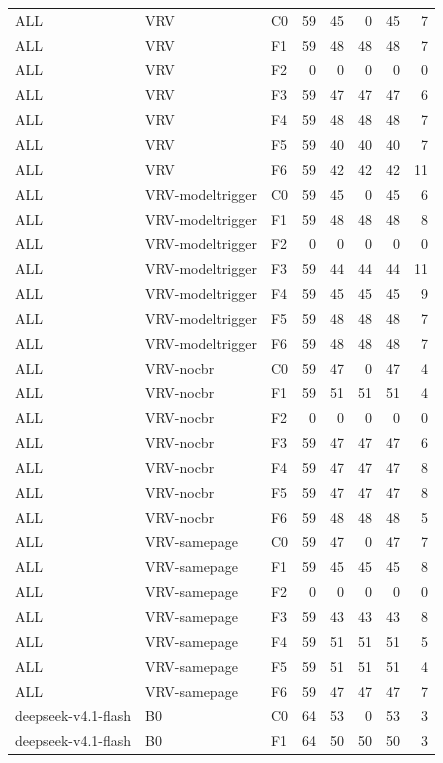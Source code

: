 \begin{tabular}{lllrrrrr}
ALL & VRV & C0 & 59 & 45 & 0 & 45 & 7 \\
ALL & VRV & F1 & 59 & 48 & 48 & 48 & 7 \\
ALL & VRV & F2 & 0 & 0 & 0 & 0 & 0 \\
ALL & VRV & F3 & 59 & 47 & 47 & 47 & 6 \\
ALL & VRV & F4 & 59 & 48 & 48 & 48 & 7 \\
ALL & VRV & F5 & 59 & 40 & 40 & 40 & 7 \\
ALL & VRV & F6 & 59 & 42 & 42 & 42 & 11 \\
ALL & VRV-modeltrigger & C0 & 59 & 45 & 0 & 45 & 6 \\
ALL & VRV-modeltrigger & F1 & 59 & 48 & 48 & 48 & 8 \\
ALL & VRV-modeltrigger & F2 & 0 & 0 & 0 & 0 & 0 \\
ALL & VRV-modeltrigger & F3 & 59 & 44 & 44 & 44 & 11 \\
ALL & VRV-modeltrigger & F4 & 59 & 45 & 45 & 45 & 9 \\
ALL & VRV-modeltrigger & F5 & 59 & 48 & 48 & 48 & 7 \\
ALL & VRV-modeltrigger & F6 & 59 & 48 & 48 & 48 & 7 \\
ALL & VRV-nocbr & C0 & 59 & 47 & 0 & 47 & 4 \\
ALL & VRV-nocbr & F1 & 59 & 51 & 51 & 51 & 4 \\
ALL & VRV-nocbr & F2 & 0 & 0 & 0 & 0 & 0 \\
ALL & VRV-nocbr & F3 & 59 & 47 & 47 & 47 & 6 \\
ALL & VRV-nocbr & F4 & 59 & 47 & 47 & 47 & 8 \\
ALL & VRV-nocbr & F5 & 59 & 47 & 47 & 47 & 8 \\
ALL & VRV-nocbr & F6 & 59 & 48 & 48 & 48 & 5 \\
ALL & VRV-samepage & C0 & 59 & 47 & 0 & 47 & 7 \\
ALL & VRV-samepage & F1 & 59 & 45 & 45 & 45 & 8 \\
ALL & VRV-samepage & F2 & 0 & 0 & 0 & 0 & 0 \\
ALL & VRV-samepage & F3 & 59 & 43 & 43 & 43 & 8 \\
ALL & VRV-samepage & F4 & 59 & 51 & 51 & 51 & 5 \\
ALL & VRV-samepage & F5 & 59 & 51 & 51 & 51 & 4 \\
ALL & VRV-samepage & F6 & 59 & 47 & 47 & 47 & 7 \\
deepseek-v4.1-flash & B0 & C0 & 64 & 53 & 0 & 53 & 3 \\
deepseek-v4.1-flash & B0 & F1 & 64 & 50 & 50 & 50 & 3 \\

\end{tabular}
